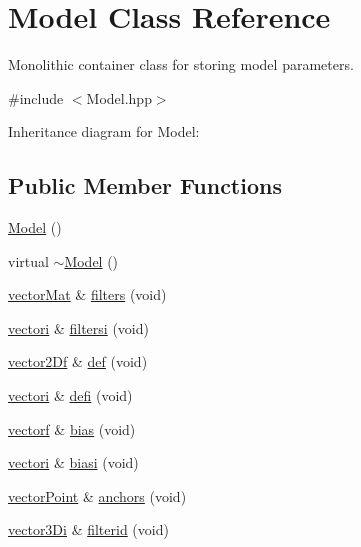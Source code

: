 \hypertarget{classModel}{}\section{Model Class Reference}
\label{classModel}


Monolithic container class for storing model parameters.  




{\ttfamily \#include $<$Model.\+hpp$>$}



Inheritance diagram for Model\+:
\subsection*{Public Member Functions}
\begin{DoxyCompactItemize}
\item 
\hyperlink{classModel_ae3b375de5f6df4faf74a95d64748e048}{Model} ()
\item 
virtual \hyperlink{classModel_af032d8433c87a0a3a431faf6563a1f03}{$\sim$\+Model} ()
\item 
\hyperlink{types_8hpp_a3207a7addcfa415d1c83622febcb1e9b}{vector\+Mat} \& \hyperlink{classModel_ad923232199aa30bb69436fd08ef01b6d}{filters} (void)
\item 
\hyperlink{types_8hpp_a44529587d60e73bf0e689a82e5e70a55}{vectori} \& \hyperlink{classModel_a66a09e10ef051d4c261546d4016b7d74}{filtersi} (void)
\item 
\hyperlink{types_8hpp_a94f2d563f3725231a6f684b4dce4f1ef}{vector2\+Df} \& \hyperlink{classModel_a2d471c6cb6ab4273963b986e21f91f82}{def} (void)
\item 
\hyperlink{types_8hpp_a44529587d60e73bf0e689a82e5e70a55}{vectori} \& \hyperlink{classModel_a68d158f45c15ca0417b97cc140c498c6}{defi} (void)
\item 
\hyperlink{types_8hpp_a4da5db3ee9e284f719ef5764dbadffc8}{vectorf} \& \hyperlink{classModel_aad5223ba9a48a9d4301d004d11457006}{bias} (void)
\item 
\hyperlink{types_8hpp_a44529587d60e73bf0e689a82e5e70a55}{vectori} \& \hyperlink{classModel_a478f9460cf39e00f0d65c0afbecd8677}{biasi} (void)
\item 
\hyperlink{types_8hpp_ac468fcf6870d6563ac8fa3669845afcc}{vector\+Point} \& \hyperlink{classModel_a047262c3a9de203b9d67094128c483a5}{anchors} (void)
\item 
\hyperlink{types_8hpp_a1f7c8ad00a53fb2d61b3656da9a6581d}{vector3\+Di} \& \hyperlink{classModel_a35c8491baa7893180abf62f22be40499}{filterid} (void)

\end{DoxyCompactItemize}
